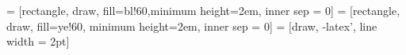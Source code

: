 \documentclass{beamer}
\begin{document}
\pagestyle{empty}






 = [rectangle, draw, fill=bl!60,minimum height=2em, inner sep = 0]
 = [rectangle, draw, fill=ye!60, minimum height=2em, inner sep = 0]
 = [draw, -latex', line width = 2pt]
\end{document}
